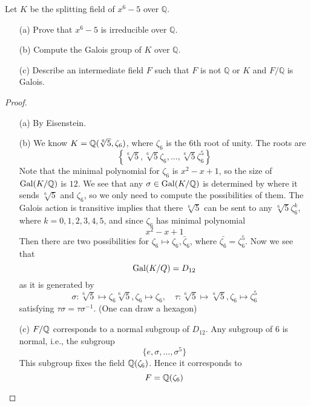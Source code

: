 \begin{prob}[S2013-Q6]
    Let \(K\) be the splitting field of \(x^6 - 5\) over \(\mathbb{Q}\).
    \begin{itemize}
        \item[(a)] Prove that \(x^6 - 5\) is irreducible over \(\mathbb{Q}\).
        \item[(b)] Compute the Galois group of \(K\) over \(\mathbb{Q}\).
        \item[(c)] Describe an intermediate field \(F\) such that \(F\) is not \(\mathbb{Q}\) or \(K\) and \(F/\mathbb{Q}\) is Galois.
    \end{itemize}
\end{prob}
\begin{proof}
    \begin{itemize}
        \item[(a)] By Eisenstein.
        \item[(b)] We know $K=\mathbb{Q}(\sqrt[6]{5}, \zeta_6)$, where $\zeta_6$ is the $6$th root of unity. The roots are 
        \begin{equation*}
            \left\{\sqrt[6]{5}, \sqrt[6]{5}\zeta_6, \dots, \sqrt[6]{5}\zeta_6^5\right\}
        \end{equation*}
        Note that the minimal polynomial for $\zeta_6$ is $x^2-x+1$, so the size of $\text{Gal}(K/\mathbb{Q})$ is $12$. We see that any $\sigma\in \text{Gal}(K/\mathbb{Q})$ is determined by where it sends $\sqrt[6]{5}$ and $\zeta_6$, so we  only need to compute the possibilities of them. The Galois action is transitive implies that there $\sqrt[6]{5}$ can be sent to any $\sqrt[6]{5}\zeta_6^k$, where $k=0, 1,2,3,4,5$, and since $\zeta_6$ has minimal polynomial 
        \begin{equation*}
            x^2-x+1
        \end{equation*}
        Then there are two possibilities for $\zeta_6\mapsto \zeta_6, \bar{\zeta}_6$, where $\bar{\zeta_6}=\zeta_6^5$. Now we see that 
        \begin{equation*}
            \text{Gal}(K/Q)=D_{12}
        \end{equation*}
        as it is generated by
        \begin{equation*}
            \sigma: \sqrt[6]{5}\mapsto\zeta_6\sqrt[6]{5}, \zeta_6\mapsto\zeta_6, \quad\tau: \sqrt[6]{5}\mapsto\sqrt[6]{5},  \zeta_6\mapsto \zeta_6^5
        \end{equation*}
        satisfying $\tau\sigma=\tau\sigma^{-1}$. (One can draw a hexagon)
        \item[(c)] $F/\mathbb{Q}$ corresponds to a normal subgroup of $D_{12}$. Any subgroup of $6$ is normal, i.e., the subgroup 
        \begin{equation*}
            \{e, \sigma, \dots, \sigma^5\}
        \end{equation*}
        This subgroup fixes the field $\mathbb{Q}(\zeta_6)$. Hence it corresponds to
        \begin{equation*}
            F=\mathbb{Q}(\zeta_6)
        \end{equation*}
    \end{itemize}
\end{proof}





